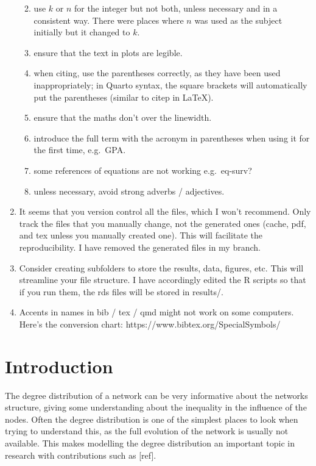 \documentclass[
  sn-basic,
]{sn-jnl}
\providecommand{\tightlist}{%
  \setlength{\itemsep}{0pt}\setlength{\parskip}{0pt}}
\theoremstyle{plain}
\theoremstyle{remark}
\begin{document}
\begin{enumerate}
  \begin{enumerate}
  \def\labelenumii{\alph{enumii}.}
  \tightlist
  \item
    use \(k\) or \(n\) for the integer but not both, unless necessary
    and in a consistent way. There were places where \(n\) was used as
    the subject initially but it changed to \(k\).
  \item
    ensure that the text in plots are legible.
  \item
    when citing, use the parentheses correctly, as they have been used
    inappropriately; in Quarto syntax, the square brackets will
    automatically put the parentheses (similar to citep in LaTeX).
  \item
    ensure that the maths don't over the linewidth.
  \item
    introduce the full term with the acronym in parentheses when using
    it for the first time, e.g.~GPA.
  \item
    some references of equations are not working e.g.~eq-surv?
  \item
    unless necessary, avoid strong adverbs / adjectives.
  \end{enumerate}
\item
  It seems that you version control all the files, which I won't
  recommend. Only track the files that you manually change, not the
  generated ones (cache, pdf, and tex unless you manually created one).
  This will facilitate the reproducibility. I have removed the generated
  files in my branch.
\item
  Consider creating subfolders to store the results, data, figures, etc.
  This will streamline your file structure. I have accordingly edited
  the R scripts so that if you run them, the rds files will be stored in
  results/.
\item
  Accents in names in bib / tex / qmd might not work on some computers.
  Here's the conversion chart: https://www.bibtex.org/SpecialSymbols/
\end{enumerate}

\section{Introduction}\label{sec-intro}

The degree distribution of a network can be very informative about the
networks structure, giving some understanding about the inequality in
the influence of the nodes. Often the degree distribution is one of the
simplest places to look when trying to understand this, as the full
evolution of the network is usually not available. This makes modelling
the degree distribution an important topic in research with
contributions such as {[}ref{]}.
\end{document}
